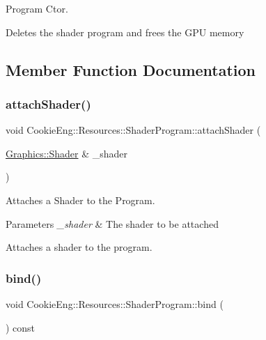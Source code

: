 Program Ctor. 

Deletes the shader program and frees the G\+PU memory 

\subsection{Member Function Documentation}
\mbox{\label{class_cookie_eng_1_1_resources_1_1_shader_program_a951108feded567e573928dbb1d8caeca}} 
\subsubsection{\texorpdfstring{attach\+Shader()}{attachShader()}}
{\footnotesize\ttfamily void Cookie\+Eng\+::\+Resources\+::\+Shader\+Program\+::attach\+Shader (\begin{DoxyParamCaption}\item[{\hyperlink{class_cookie_eng_1_1_graphics_1_1_shader}{Graphics\+::\+Shader} \&}]{\+\_\+shader }\end{DoxyParamCaption})}



Attaches a Shader to the Program. 


\begin{DoxyParams}{Parameters}
{\em \+\_\+shader} & The shader to be attached\\
\hline
\end{DoxyParams}
Attaches a shader to the program. \mbox{\label{class_cookie_eng_1_1_resources_1_1_shader_program_a4824333f2e0ee0e7cfc91cb0de92e065}} 
\subsubsection{\texorpdfstring{bind()}{bind()}}
{\footnotesize\ttfamily void Cookie\+Eng\+::\+Resources\+::\+Shader\+Program\+::bind (\begin{DoxyParamCaption}{ }\end{DoxyParamCaption}) const}



